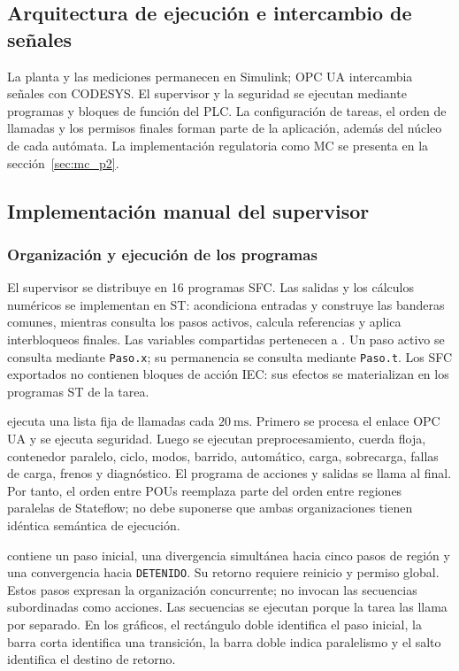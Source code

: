 \documentclass[a4paper,10pt,onecolumn,journal]{ieeeconf}
\numberwithin{equation}{section}
\begin{document}

\subsection{Arquitectura de ejecución e intercambio de señales}
La planta y las mediciones permanecen en Simulink; OPC UA intercambia señales con CODESYS. El supervisor y la seguridad se ejecutan mediante programas y bloques de función del PLC. La configuración de tareas, el orden de llamadas y los permisos finales forman parte de la aplicación, además del núcleo de cada autómata. La implementación regulatoria como MC se presenta en la sección~\ref{sec:mc_p2}.


\subsection{Implementación manual del supervisor}
\label{subsec:sup_manual_codesys}
\subsubsection{Organización y ejecución de los programas}
El supervisor se distribuye en 16 programas SFC. Las salidas y los cálculos numéricos se implementan en ST:  acondiciona entradas y construye las banderas comunes, mientras  consulta los pasos activos, calcula referencias y aplica interbloqueos finales. Las variables compartidas pertenecen a . Un paso activo se consulta mediante \texttt{Paso.x}; su permanencia se consulta mediante \texttt{Paso.t}. Los SFC exportados no contienen bloques de acción IEC: sus efectos se materializan en los programas ST de la tarea.

 ejecuta una lista fija de llamadas cada $20~\mathrm{ms}$. Primero se procesa el enlace OPC UA y se ejecuta seguridad. Luego se ejecutan preprocesamiento, cuerda floja, contenedor paralelo, ciclo, modos, barrido, automático, carga, sobrecarga, fallas de carga, frenos y diagnóstico. El programa de acciones y salidas se llama al final. Por tanto, el orden entre POUs reemplaza parte del orden entre regiones paralelas de Stateflow; no debe suponerse que ambas organizaciones tienen idéntica semántica de ejecución.

 contiene un paso inicial, una divergencia simultánea hacia cinco pasos de región y una convergencia hacia \texttt{DETENIDO}. Su retorno requiere reinicio y permiso global. Estos pasos expresan la organización concurrente; no invocan las secuencias subordinadas como acciones. Las secuencias se ejecutan porque la tarea las llama por separado. En los gráficos, el rectángulo doble identifica el paso inicial, la barra corta identifica una transición, la barra doble indica paralelismo y el salto identifica el destino de retorno.
\end{document}
